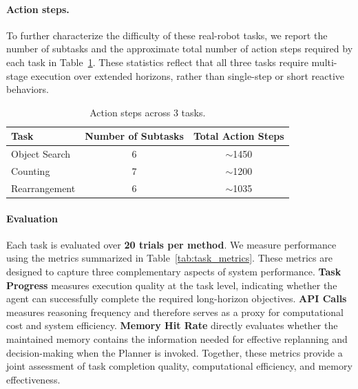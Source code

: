\paragraph{Action steps.}
To further characterize the difficulty of these real-robot tasks, we report the number of subtasks and the approximate total number of action steps required by each task in Table~\ref{tab:task_complexity}. These statistics reflect that all three tasks require multi-stage execution over extended horizons, rather than single-step or short reactive behaviors.

\begin{table}[H]
\centering
\small
\setlength{\tabcolsep}{6pt}
\caption{Action steps across 3 tasks.}
\begin{tabular}{lcc}
\toprule
\textbf{Task} & \textbf{Number of Subtasks} & \textbf{Total Action Steps} \\
\midrule
Object Search & 6 & $\sim$1450 \\
Counting & 7 & $\sim$1200 \\
Rearrangement & 6 & $\sim$1035 \\
\bottomrule
\end{tabular}
\label{tab:task_complexity}
\end{table}

\paragraph{Evaluation}
\label{app:eval}
Each task is evaluated over \textbf{20 trials per method}. We measure performance using the metrics summarized in Table~\ref{tab:task_metrics}. These metrics are designed to capture three complementary aspects of system performance. \textbf{Task Progress} measures execution quality at the task level, indicating whether the agent can successfully complete the required long-horizon objectives. \textbf{API Calls} measures reasoning frequency and therefore serves as a proxy for computational cost and system efficiency. \textbf{Memory Hit Rate} directly evaluates whether the maintained memory contains the information needed for effective replanning and decision-making when the Planner is invoked. Together, these metrics provide a joint assessment of task completion quality, computational efficiency, and memory effectiveness.



